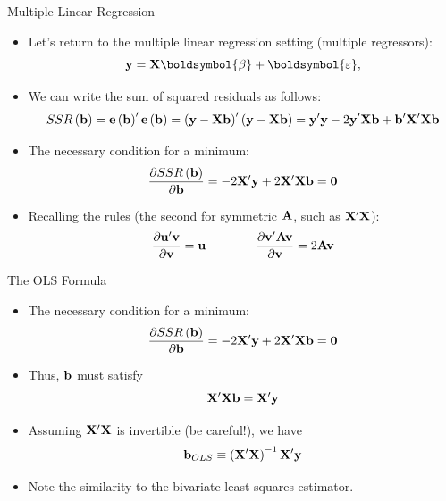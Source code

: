 \documentclass[aspectratio=169,11pt]{beamer}
\begin{document}
\begin{frame}{Multiple Linear Regression}
\begin{itemize}
	\item Let's return to the multiple linear regression setting (multiple regressors):
	\begin{equation*}
		{\bf y}= {\bf X} \boldsymbol{\beta} + \boldsymbol{\varepsilon},
	\end{equation*}

	\item We can write the sum of squared residuals as follows:\[
	SSR\left({\bf b}\right) = {\bf e} \left({\bf b}\right) '  {\bf e} \left({\bf b}\right) = \left({\bf y} - {\bf X}{\bf b}\right)'\left({\bf y} - {\bf X}{\bf b}\right) = {\bf y}'{\bf y} - 2{\bf y}'{\bf X}{\bf b} + {\bf b}' {\bf X}'{\bf X}{\bf b} 
\]


	\item The necessary condition for a minimum:\[
	\frac{\partial SSR\left({\bf b}\right)}{\partial {\bf b}} = - 2 {\bf X}' {\bf y} + 2 {\bf X}'{\bf X} {\bf b} = {\bf 0} 
	\]

	\item Recalling the rules (the second for symmetric ${\bf A}$, such as ${\bf X}'{\bf X}$):\[
\frac{\partial{\bf u}'{\bf v}}{\partial{\bf v}}={\bf u}\qquad\qquad\frac{\partial{\bf v}'{\bf A}{\bf v}}{\partial{\bf v}}=2{\bf A}{\bf v}
\]

\end{itemize}
\end{frame}


\begin{frame}{The OLS Formula}
\begin{itemize}
	\item The necessary condition for a minimum:\[
	\frac{\partial SSR\left({\bf b}\right)}{\partial {\bf b}} = - 2 {\bf X}' {\bf y} + 2 {\bf X}'{\bf X} {\bf b} = {\bf 0} 
	\]

	\item Thus, ${\bf b}$ must satisfy\[
	{\bf X}'{\bf X} {\bf b} =  {\bf X}' {\bf y} 
	\]


	\item Assuming ${\bf X}'{\bf X}$ is invertible (be careful!), we have\[
	{\bf b}_{OLS} \equiv  \left({\bf X}'{\bf X}\right)^{-1} {\bf X}' {\bf y} 
	\]

	\item Note the similarity to the bivariate least squares estimator. 

\end{itemize}
\end{frame}
\end{document}
